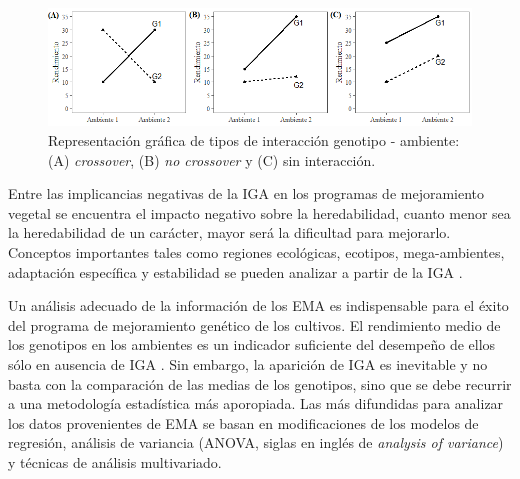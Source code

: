 \begin{figure}[h]
\begin{center}
\includegraphics[width=14cm]{./Graficos/interac}
\end{center}
\caption{  Representación gráfica de tipos de interacción genotipo - ambiente: (A) \emph{crossover}, (B) \emph{no crossover} y (C) sin interacción.}
\label{fig:fig11}
\end{figure}


Entre las implicancias negativas de la IGA en los programas de mejoramiento vegetal se encuentra el impacto negativo sobre la heredabilidad, cuanto menor sea la heredabilidad de un carácter, mayor será la dificultad para mejorarlo. Conceptos importantes tales como regiones ecológicas, ecotipos, mega-ambientes, adaptación específica y estabilidad se pueden analizar a partir de la IGA \citep{YanHunt2001}.

Un análisis adecuado de la información de los EMA es indispensable para el éxito del programa de mejoramiento genético de los cultivos. El rendimiento medio de los genotipos en los ambientes es un indicador suficiente del desempeño de ellos sólo en ausencia de IGA \citep{YanKang2003}. Sin embargo, la aparición de IGA es inevitable y no basta con la comparación de las medias de los genotipos, sino que se debe recurrir a una metodología estadística más aporopiada. Las más difundidas para analizar los datos provenientes de EMA se basan en modificaciones de los modelos de regresión, análisis de variancia (ANOVA, siglas en inglés de \emph{analysis of variance}) y técnicas de análisis multivariado. 

